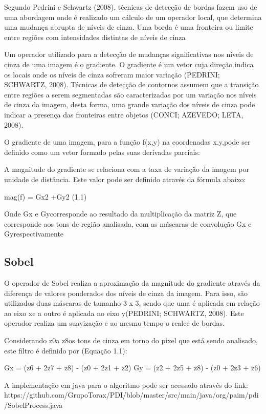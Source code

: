 \documentclass[
	12pt,				%
	oneside,			%
	a4paper,			%
	english,			%
	french,				%
	spanish,			%
	brazil,				%
	]{abntex2}
\begin{document}
Segundo Pedrini e Schwartz (2008), técnicas de detecção de bordas fazem uso de uma abordagem onde é realizado um cálculo de um operador local, que determina uma mudança abrupta de níveis de cinza. Uma borda é uma fronteira ou limite entre regiões com intensidades distintas de níveis de cinza

Um operador utilizado para a detecção de mudanças significativas nos níveis de cinza de uma imagem é o gradiente. O gradiente é um vetor cuja direção indica os locais onde os níveis de cinza sofreram maior variação (PEDRINI; SCHWARTZ, 2008). Técnicas de detecção de contornos assumem que a transição entre regiões a serem segmentadas são caracterizadas por um variação nos níveis de cinza da imagem, desta forma, uma grande variação dos níveis de cinza pode indicar a presença das fronteiras entre objetos (CONCI; AZEVEDO; LETA, 2008). 

O gradiente de uma imagem, para a função f(x,y) na coordenadas x,y,pode ser definido como um vetor formado pelas suas derivadas parciais:

A magnitude do gradiente se relaciona com a taxa de variação da imagem por unidade de distância. Este valor pode ser definido através da fórmula abaixo:

mag(f) = Gx2 +Gy2 (1.1)

Onde Gx e Gycorresponde ao resultado da multiplicação da matriz Z, que corresponde aos tons de região analisada, com as máscaras de convolução Gx e Gyrespectivamente

\subsection{Sobel}

O operador de Sobel realiza a aproximação da magnitude do gradiente através da diferença de valores ponderados dos níveis de cinza da imagem. Para isso, são utilizados duas máscaras de tamanho 3 x 3, sendo que uma é aplicada em relação ao eixo xe a outro é aplicada no eixo y(PEDRINI; SCHWARTZ, 2008). Este operador realiza um suavização e ao mesmo tempo o realce de bordas.

Considerando z0a z8os tons de cinza em torno do pixel que está sendo analisado, este filtro é definido por (Equação 1.1):

Gx = (z6 + 2z7 + z8) - (z0 + 2z1 + z2)
Gy = (z2 + 2z5 + z8) - (z0 + 2z3 + z6)

A implementação em java para o algoritmo pode ser acessado através do link:
https://github.com/GrupoTorax/PDI/blob/master/src/main/java/org/paim/pdi/SobelProcess.java
\end{document}
